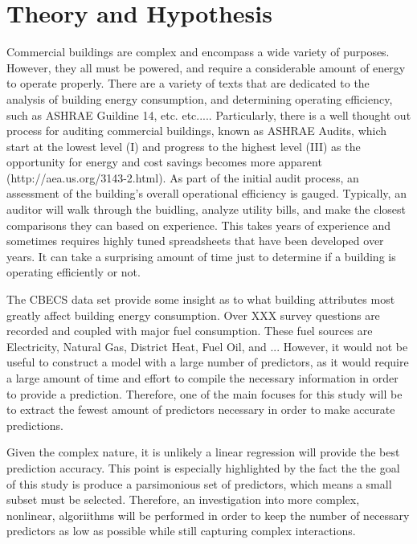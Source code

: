 \section*{Theory and Hypothesis}
\label{sec:theory_and_hypothesis}

Commercial buildings are complex and encompass a wide variety of purposes. However, they all must be powered, and require a considerable amount of energy to operate properly.  There are a variety of texts that are dedicated to the analysis of building energy consumption, and determining operating efficiency, such as ASHRAE Guildine 14, etc. etc.....  Particularly, there is a well thought out process for auditing commercial buildings, known as ASHRAE Audits, which start at the lowest level (I) and progress to the highest level (III) as the opportunity for energy and cost savings becomes more apparent (http://aea.us.org/3143-2.html).  As part of the initial audit process, an assessment of the building's overall operational efficiency is gauged.  Typically, an auditor will walk through the buidling, analyze utility bills, and make the closest comparisons they can based on experience.  This takes years of experience and sometimes requires highly tuned spreadsheets that have been developed over years.  It can take a surprising amount of time just to determine if a building is operating efficiently or not.

The CBECS data set provide some insight as to what building attributes most greatly affect building energy consumption.  Over XXX survey questions are recorded and coupled with major fuel consumption.  These fuel sources are Electricity, Natural Gas, District Heat, Fuel Oil, and ...  However, it would not be useful to construct a model with a large number of predictors, as it would require a large amount of time and effort to compile the necessary information in order to provide a prediction.  Therefore, one of the main focuses for this study will be to extract the fewest amount of predictors necessary in order to make accurate predictions.  

Given the complex nature, it is unlikely a linear regression will provide the best prediction accuracy.  This point is especially highlighted by the fact the the goal of this study is produce a parsimonious set of predictors, which means a small subset must be selected.  Therefore, an investigation into more complex, nonlinear, algoriithms will be performed in order to keep the number of necessary predictors as low as possible while still capturing complex interactions.